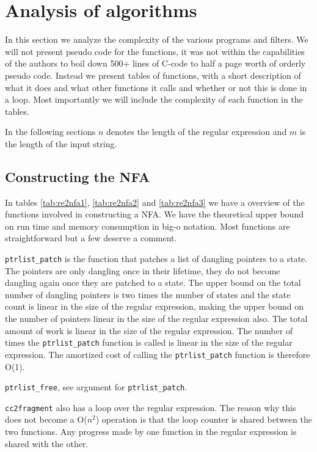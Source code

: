 \section{Analysis of algorithms}
\label{sec:theoretical}
In this section we analyze the complexity of the various programs and
filters. We will not present pseudo code for the functions, it was not
within the capabilities of the authors to boil down 500+ lines of
C-code to half a page worth of orderly pseudo code. Instead we present
tables of functions, with a short description of what it does and what
other functions it calls and whether or not this is done in a
loop. Most importantly we will include the complexity of each function
in the tables. 

In the following sections $n$ denotes the length of the regular
expression and $m$ is the length of the input string.

\subsection{Constructing the NFA}

In tables \ref{tab:re2nfa1}, \ref{tab:re2nfa2} and \ref{tab:re2nfa3}
we have a overview of the functions involved in constructing a NFA. We
have the theoretical upper bound on run time and memory consumption in
big-o notation. Most functions are straightforward but a few deserve a
comment. 

\lstinline{ptrlist_patch} is the function that patches a list of
dangling pointers to a state. The pointers are only dangling once in
their lifetime, they do not become dangling again once they are
patched to a state. The upper bound on the total number of dangling
pointers is two times the number of states and the state count is
linear in the size of the regular expression, making the upper bound
on the number of pointers linear in the size of the regular expression
also. The total amount of work is linear in the size of the regular
expression. The number of times the \lstinline{ptrlist_patch} function
is called is linear in the size of the regular expression. The
amortized cost of calling the \lstinline{ptrlist_patch} function is
therefore O(1).

\lstinline{ptrlist_free}, see argument for \lstinline{ptrlist_patch}.

\lstinline{cc2fragment} also has a loop over the regular
expression. The reason why this does not become a O($n^2$) operation is
that the loop counter is shared between the two functions. Any
progress made by one function in the regular expression is shared with
the other.


